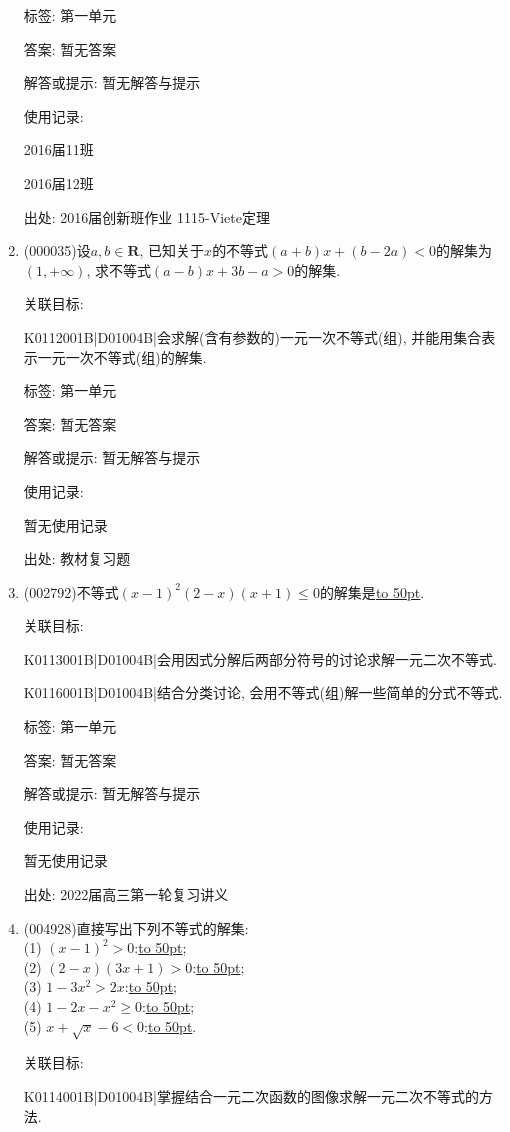 \documentclass[10pt,a4paper]{article}
\newcommand{\blank}[1]{\underline{\hbox to #1pt{}}}
\begin{document}
\begin{enumerate}[1.]
标签: 第一单元

答案: 暂无答案

解答或提示: 暂无解答与提示

使用记录:

2016届11班	

2016届12班	


出处: 2016届创新班作业	1115-Viete定理
\item { (000035)}设$a,b\in \mathbf{R}$, 已知关于$x$的不等式$(a+b)x+(b-2a)<0$的解集为$(1, +\infty)$, 求不等式$(a-b)x+3b-a>0$的解集.


关联目标:

K0112001B|D01004B|会求解(含有参数的)一元一次不等式(组), 并能用集合表示一元一次不等式(组)的解集.



标签: 第一单元

答案: 暂无答案

解答或提示: 暂无解答与提示

使用记录:

暂无使用记录


出处: 教材复习题
\item { (002792)}不等式$(x-1)^2(2-x)(x+1)\le 0$的解集是\blank{50}.


关联目标:

K0113001B|D01004B|会用因式分解后两部分符号的讨论求解一元二次不等式.

K0116001B|D01004B|结合分类讨论, 会用不等式(组)解一些简单的分式不等式.



标签: 第一单元

答案: 暂无答案

解答或提示: 暂无解答与提示

使用记录:

暂无使用记录


出处: 2022届高三第一轮复习讲义
\item { (004928)}直接写出下列不等式的解集:\\
(1) $(x-1)^2>0$:\blank{50};\\
(2) $(2-x)(3x+1)>0$:\blank{50};\\
(3) $1-3x^2>2x$:\blank{50};\\
(4) $1-2x-x^2\ge 0$:\blank{50};\\
(5) $x+\sqrt x-6<0$:\blank{50}.


关联目标:

K0114001B|D01004B|掌握结合一元二次函数的图像求解一元二次不等式的方法.




\end{enumerate}
\end{document}
